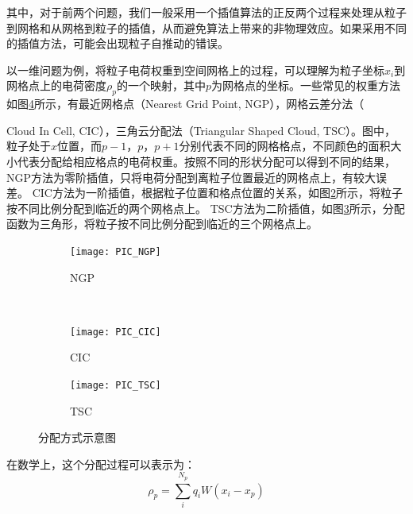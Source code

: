 其中，对于前两个问题，我们一般采用一个插值算法的正反两个过程来处理从粒子到网格和从网格到粒子的插值，从而避免算法上带来的非物理效应。如果采用不同的插值方法，可能会出现粒子自推动的错误。

以一维问题为例，将粒子电荷权重到空间网格上的过程，可以理解为粒子坐标$x_i$到网格点上的电荷密度$\rho_p$的一个映射，其中$p$为网格点的坐标。一些常见的权重方法如图\ref{fig:PIC_weighting}所示，有最近网格点（Nearest Grid Point, NGP），网格云差分法（{Cloud In Cell, CIC），三角云分配法（Triangular Shaped Cloud, TSC）。图中，粒子处于$x$位置，而$p-1$，$p$，$p+1$分别代表不同的网格格点，不同颜色的面积大小代表分配给相应格点的电荷权重。按照不同的形状分配可以得到不同的结果，
NGP方法为零阶插值，只将电荷分配到离粒子位置最近的网格点上，有较大误差。
CIC方法为一阶插值，根据粒子位置和格点位置的关系，如图\ref{fig:PIC_CIC}所示，将粒子按不同比例分配到临近的两个网格点上。
TSC方法为二阶插值，如图\ref{fig:PIC_TSC}所示，分配函数为三角形，将粒子按不同比例分配到临近的三个网格点上。
\begin{figure}[!htbp]
  \centering
  \begin{subfigure}[b]{0.8\textwidth}
    \texttt{[image: PIC\_NGP]}
    \caption{NGP}
    \label{fig:PIC_NGP}
  \end{subfigure}%
  ~%
  \begin{subfigure}[b]{0.8\textwidth}
    \texttt{[image: PIC\_CIC]}
    \caption{CIC}
    \label{fig:PIC_CIC}
  \end{subfigure}
  \begin{subfigure}[b]{0.8\textwidth}
    \texttt{[image: PIC\_TSC]}
    \caption{TSC}
    \label{fig:PIC_TSC}
  \end{subfigure}%
  \caption{分配方式示意图}
  \label{fig:PIC_weighting}
\end{figure}

在数学上，这个分配过程可以表示为：
\begin{equation}\label{eq:weight}
  \rho_p=\sum_{i}^{N_p} q_i W(x_i-x_p)
\end{equation}

}
